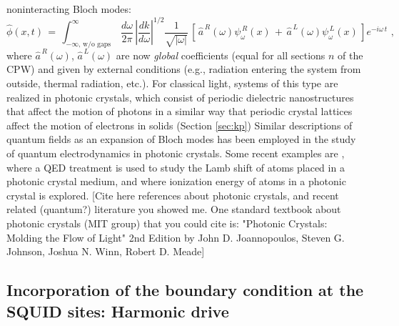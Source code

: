 noninteracting Bloch modes:
%
\begin{equation} \label{eq:flux_field_static}
    \hat{\phi}(x,t) \, = \, 
    \displaystyle{
    \int_{-\infty, \, \text{w/o gaps}}^{\infty} \, \frac{d\omega}{2 \pi} \, \left| \frac{d k}{d \omega} \right|^{1/2}
        \frac{1}{\sqrt{|\omega|}}} \,
    \left[ \, \hat{a}^{\,R}(\omega) \psi_{\omega}^{\,R}(x) \, + \, 
    \hat{a}^{\,L}(\omega) \psi_{\omega}^{\,L}(x)  \, \right] e^{-i \omega \, t} \, \, ,
\end{equation}
%
where $\hat{a}^{\,R}(\omega)$, $\hat{a}^{\,L}(\omega)$ are now {\em global} coefficients 
(equal for all sections $n$ of the CPW) and
given by external conditions (e.g., radiation entering the system from outside, thermal radiation, etc.). 
\color{teal}
For classical light, systems of this type are realized in photonic crystals, which consist of periodic dielectric 
nanostructures that affect the motion of photons in a similar way that periodic crystal lattices affect 
the motion of electrons in solids (Section \ref{sec:kp})
\color{black}
 Similar descriptions of quantum fields as an expansion of Bloch modes has been employed in the study of quantum electrodynamics in photonic crystals. Some recent examples are \cite{Gainutdinov2018}, where a QED treatment is used to study the Lamb shift of atoms placed in a photonic crystal medium, and \cite{Gainutdinov2021} where ionization energy of atoms in a photonic crystal is explored.
%
\color{red}
[Cite here references about photonic crystals, and recent related (quantum?) literature you showed me.
One standard textbook about photonic crystals (MIT group) that you could cite is:
"Photonic Crystals: Molding the Flow of Light" 2nd Edition
by John D. Joannopoulos, Steven G. Johnson, Joshua N. Winn, Robert D. Meade]
\color{black}


\subsection{Incorporation of the boundary condition at the SQUID sites: Harmonic drive} 
\label{subsec:bc_drive}

